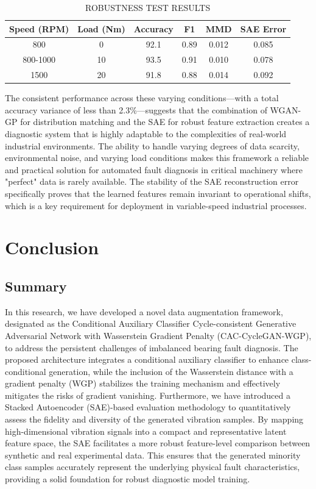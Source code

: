 \documentclass[twocolumn]{IEEEtran}
\begin{document}
\begin{table}[htbp]
\centering
\caption{ROBUSTNESS TEST RESULTS}
\label{tab:robustness}
\begin{tabular}{cccccc}
\hline
Speed (RPM) & Load (Nm) & Accuracy & F1 & MMD & SAE Error \\
\hline
800 & 0 & 92.1 & 0.89 & 0.012 & 0.085 \\
800-1000 & 10 & 93.5 & 0.91 & 0.010 & 0.078 \\
1500 & 20 & 91.8 & 0.88 & 0.014 & 0.092 \\
\hline
\end{tabular}
\end{table}
The consistent performance across these varying conditions—with a total accuracy variance of less than 2.3\%—suggests that the combination of WGAN-GP for distribution matching and the SAE for robust feature extraction creates a diagnostic system that is highly adaptable to the complexities of real-world industrial environments. The ability to handle varying degrees of data scarcity, environmental noise, and varying load conditions makes this framework a reliable and practical solution for automated fault diagnosis in critical machinery where "perfect" data is rarely available. The stability of the SAE reconstruction error specifically proves that the learned features remain invariant to operational shifts, which is a key requirement for deployment in variable-speed industrial processes.


\section{Conclusion}
\label{sec:conclusion}

\subsection{Summary}
In this research, we have developed a novel data augmentation framework, designated as the Conditional Auxiliary Classifier Cycle-consistent Generative Adversarial Network with Wasserstein Gradient Penalty (CAC-CycleGAN-WGP), to address the persistent challenges of imbalanced bearing fault diagnosis. The proposed architecture integrates a conditional auxiliary classifier to enhance class-conditional generation, while the inclusion of the Wasserstein distance with a gradient penalty (WGP) stabilizes the training mechanism and effectively mitigates the risks of gradient vanishing. Furthermore, we have introduced a Stacked Autoencoder (SAE)-based evaluation methodology to quantitatively assess the fidelity and diversity of the generated vibration samples. By mapping high-dimensional vibration signals into a compact and representative latent feature space, the SAE facilitates a more robust feature-level comparison between synthetic and real experimental data. This ensures that the generated minority class samples accurately represent the underlying physical fault characteristics, providing a solid foundation for robust diagnostic model training.
\end{document}
